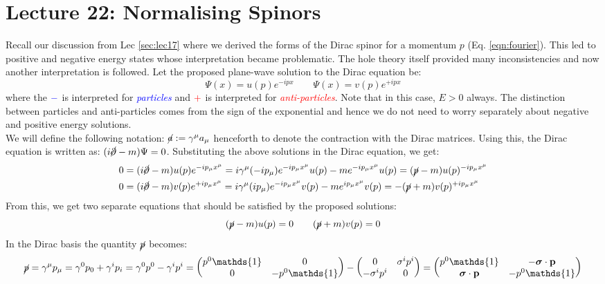 \section*{Lecture 22: Normalising Spinors}
Recall our discussion from  Lec \ref{sec:lec17} where we derived the forms of the Dirac spinor for a momentum $p$ (Eq. \ref{eqn:fourier}). This led to positive and negative energy states whose interpretation became problematic. The hole theory itself provided many inconsistencies and now another interpretation is followed. Let the proposed plane-wave solution to the Dirac equation be:
$$\Psi(x) = u(p) e^{-i px} \qquad \Psi(x) = v(p) e^{+ipx}$$
where the $\mathcolor{blue}{-}$ is interpreted for \textit{\textcolor{blue}{particles}} and $\mathcolor{red}{+}$ is interpreted for \textit{\textcolor{red}{anti-particles}}. Note that in this case, $E>0$ always. The distinction between particles and anti-particles comes from the sign of the exponential and hence we do not need to worry separately about negative and positive energy solutions. \\[0.2cm]
We will define the following notation: $\cancel{a} := \gamma^\mu a_{\mu}$ henceforth to denote the contraction with the Dirac matrices. Using this, the Dirac equation is written as: $(i\cancel{\partial}-m)\Psi = 0$. Substituting the above solutions in the Dirac equation, we get: 
\begin{align*}
    0&= (i\cancel{\partial} - m)u(p)e^{-ip_\mu x^\mu} = i \gamma^\mu (-ip_\mu)e^{-ip_\mu x^\mu}u(p) - me^{-ip_\mu x^\mu}u(p) = (\cancel{p}-m)u(p)^{-ip_\mu x^\mu}\\
    0&=(i\cancel{\partial} - m)v(p)e^{+ip_\mu x^\mu} = i \gamma^\mu (ip_\mu)e^{-ip_\mu x^\mu}v(p) - me^{ip_\mu x^\mu}v(p) = -(\cancel{p}+m)v(p)^{+ip_\mu x^\mu}
\end{align*}
From this, we get two separate equations that should be satisfied by the proposed solutions:
\begin{equation}\label{eqn:hehe}
    (\cancel{p} - m ) u(p) = 0 \qquad (\cancel{p} + m ) v(p) = 0
\end{equation}
In the Dirac basis the quantity $\cancel{p}$ becomes:
\begin{equation}\label{eqn:gammap}
    \gsl{p} = \gamma^\mu p_\mu = \gamma^0p_0 + \gamma^i p_i =\gamma^0{p^0} - \gamma^i p^i  = \mqty({p^0}\mathds{1} & 0 \\ 0 & -{p^0}\mathds{1} ) - \mqty(0 & \sigma^i p^i \\ -\sigma^i p^i& 0) = \mqty({p^0}\mathds{1} & -\bs{\sigma}\cdot \vb{p}\\ \bs{\sigma}\cdot \vb{p} & -{p^0}\mathds{1})
\end{equation}
